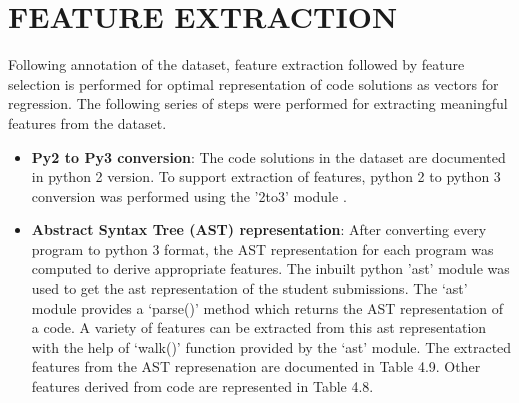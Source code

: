 \newpage

\section{FEATURE EXTRACTION}

Following annotation of the dataset, feature extraction followed by feature selection is performed for optimal representation of code solutions as vectors for regression. The following series of steps were performed for extracting meaningful features from the dataset.

\begin{itemize}
        \item \textbf{Py2 to Py3 conversion}: The code solutions in the dataset are documented in python 2 version. To support extraction of features, python 2 to python 3 conversion was performed using the '2to3' module \cite{G}.
        \item \textbf{Abstract Syntax Tree (AST) representation}: After converting every program to python 3 format, the AST \cite{F} representation for each program was computed to derive appropriate features. The inbuilt python 'ast' module was used to get the ast representation of the student submissions. The ‘ast’ module provides a ‘parse()’ method which returns the AST representation of a code. A variety of features can be extracted from this ast representation with the help of ‘walk()’ function provided by the ‘ast’ module. The extracted features from the AST represenation are documented in Table 4.9. Other features derived from code are represented in Table 4.8.
        
\end{itemize}

